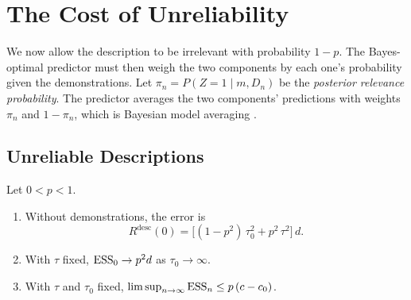 \chapter{The Cost of Unreliability}\label{ch:reliability}

We now allow the description to be irrelevant with probability $1-p$. The Bayes-optimal predictor must then weigh the two components by each one's probability given the demonstrations. Let $\pi_n=P(Z=1\mid m,D_n)$ be the \emph{posterior relevance probability}. The predictor averages the two components' predictions with weights $\pi_n$ and $1-\pi_n$, which is Bayesian model averaging \citep{hoeting1999}.

\section{Unreliable Descriptions}\label{app:reliability}

\begin{proposition}\label{prop:unreliable}
Let $0<p<1$.
\begin{enumerate}[label=(\roman*),nosep,leftmargin=*]
\item Without demonstrations, the error is
\begin{equation}\label{eq:zero}
R^{\mathrm{desc}}(0)=\big[(1-p^2)\,\tau_0^2+p^2\,\tau^2\big]\,d.
\end{equation}
\item With $\tau$ fixed, $\mathrm{ESS}_0\to p^2d$ as $\tau_0\to\infty$.
\item With $\tau$ and $\tau_0$ fixed, $\limsup_{n\to\infty}\mathrm{ESS}_n\leq p\,(c-c_0)$.
\end{enumerate}
\end{proposition}

